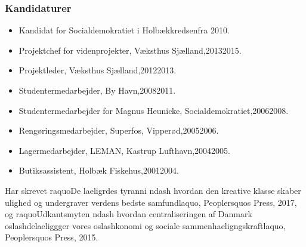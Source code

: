 \documentclass[11pt, a4paper]{awesome-cv}
\begin{document}
\begin{cvletter}
\subsubsection*{Kandidaturer}
\begin{itemize}
\item Kandidat for Socialdemokratiet i Holbækkredsenfra 2010.
\end{itemize}
\begin{itemize}
\item Projektchef for videnprojekter, Væksthus Sjælland,20132015.
\item Projektleder, Væksthus Sjælland,20122013.
\item Studentermedarbejder, By  Havn,20082011.
\item Studentermedarbejder for Magnus Heunicke, Socialdemokratiet,20062008.
\item Rengøringsmedarbejder, Superfos, Vipperød,20052006.
\item Lagermedarbejder, LEMAN, Kastrup Lufthavn,20042005.
\item Butiksassistent, Holbæk Fiskehus,20012004.
\end{itemize}
Har skrevet raquoDe laeligrdes tyranni ndash hvordan den kreative klasse skaber ulighed og undergraver verdens bedste samfundlaquo, Peoplersquos Press, 2017, og raquoUdkantsmyten ndash hvordan centraliseringen af Danmark oslashdelaeliggger vores oslashkonomi og sociale sammenhaeligngskraftlaquo, Peoplersquos Press, 2015. 

\end{cvletter}
\end{document}
